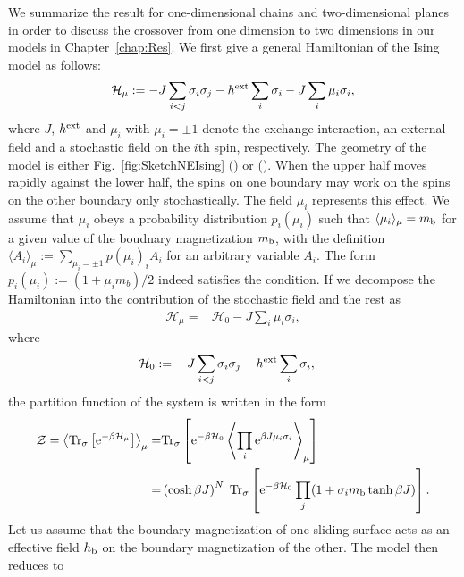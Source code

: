 We summarize the result for one-dimensional chains and two-dimensional planes in order to discuss the crossover from one dimension to two dimensions in our models in Chapter~\ref{chap:Res}. We first give a general Hamiltonian of the Ising model as follows:
\begin{align}
\mathcal{H}_{\mu}:=-J\sum_{i<j}\sigma_{i}\sigma_{j}-h^{\rm ext}\sum_{i}\sigma_{i}-J\sum_{i}\mu_{i}\sigma_{i},
\end{align}
where $J$, $h^{\rm ext}$ and $\mu_{i}$ with $\mu_{i}=\pm 1$ denote the exchange interaction, an external field and a stochastic field on the $i$th spin, respectively. The geometry of the model is either Fig.~\ref{fig:SketchNEIsing} () or (). When the upper half moves rapidly against the lower half, the spins on one boundary may work on the spins on the other boundary only stochastically. The field $\mu_{i}$ represents this effect. We assume that $\mu_{i}$ obeys a probability distribution $p_{i}(\mu_{i})$ such that $\langle\mu_{i}\rangle_{\mu}=m_{\rm b}$ for a given value of the boudnary magnetization $m_{\rm b}$, with the definition $\langle A_{i}\rangle_{\mu}:=\sum_{\mu_{i}=\pm 1}p(\mu_{i})_{i}A_{i}$ for an arbitrary variable $A_{i}$. The form $p_{i}(\mu_{i}):=(1+\mu_{i}m_{b})/2$ indeed satisfies the condition. If we decompose the Hamiltonian into the contribution of the stochastic field and the rest as
\begin{align}
\mathcal{H}_{\mu}=& \mathcal{H}_{0} - J\sum_{i}\mu_{i}\sigma_{i},
\end{align}
where
\begin{align}
\mathcal{H}_{0}:=&-J\sum_{i<j}\sigma_{i}\sigma_{j}-h^{\rm ext}\sum_{i}\sigma_{i},
\end{align}
the partition function of the system is written in the form
\begin{align}
\mathcal{Z} = \left\langle\mathrm{Tr}_{\sigma}\left[\mathrm{e}^{-\beta \mathcal{H}_{\mu}}\right]\right\rangle_{\mu} =&\mathrm{Tr}_{\sigma}\left[\mathrm{e}^{-\beta \mathcal{H}_{0}}\left\langle\prod_{i}\mathrm{e}^{\beta J\mu_{i}\sigma_{i}}\right\rangle_{\mu}\right]\\
=&\left(\cosh \beta J\right)^{N}\;\mathrm{Tr}_{\sigma}\left[\mathrm{e}^{-\beta \mathcal{H}_{0}}\prod_{j}(1+\sigma_{i}m_{\rm b}\tanh \beta J)\right].\label{eq:Z}
\end{align}
Let us assume that the boundary magnetization of one sliding surface acts as an effective field $h_{\rm b}$ on the boundary magnetization of the other.  The model then reduces to
